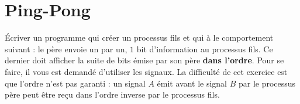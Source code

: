 \documentclass[11pt]{article}
\begin{document}
\section{Ping-Pong}

Écriver un programme qui créer un processus fils et qui à le comportement suivant : le père envoie un par un, \(1\) bit d'information au processus fils. Ce dernier doit afficher la suite de bits émise par son père \textbf{dans l'ordre}. Pour se faire, il vous est demandé d'utiliser les signaux. La difficulté de cet exercice est que l'ordre n'est pas garanti : un signal \(A\) émit avant le signal \(B\) par le processus père peut être reçu dans l'ordre inverse par le processus fils.
\end{document}
